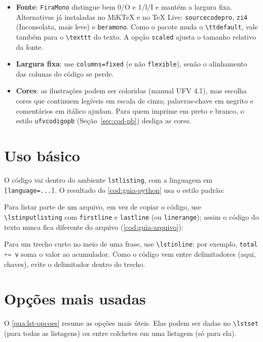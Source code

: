 \begin{itemize}
  \item \textbf{Fonte}: \texttt{FiraMono} distingue bem 0/O e 1/l/I e mantém a largura fixa.
        Alternativas já instaladas no MiKTeX e no TeX Live: \texttt{sourcecodepro},
        \texttt{zi4} (Inconsolata, mais leve) e \texttt{beramono}. Como o pacote muda o
        \texttt{\textbackslash ttdefault}, vale também para o \texttt{\textbackslash texttt} do texto.
        A opção \texttt{scaled} ajusta o tamanho relativo da fonte.
  \item \textbf{Largura fixa}: use \texttt{columns=fixed} (e não \texttt{flexible}), senão o
        alinhamento das colunas do código se perde.
  \item \textbf{Cores}: as ilustrações podem ser coloridas (manual UFV 4.1), mas escolha
        cores que continuem legíveis em escala de cinza; palavras-chave em negrito e
        comentários em itálico ajudam. Para quem imprime em preto e branco, o estilo
        \texttt{ufvcodigopb} (Seção~\ref{sec:cod-pb}) desliga as cores.
\end{itemize}

\section{Uso básico}

O código vai dentro do ambiente \texttt{lstlisting}, com a linguagem em
\texttt{[language=...]}. O resultado do \autoref{cod:guia-python} usa o estilo padrão:


Para listar parte de um arquivo, em vez de copiar o código, use \texttt{\textbackslash lstinputlisting}
com \texttt{firstline} e \texttt{lastline} (ou \texttt{linerange}); assim o código do texto
nunca fica diferente do arquivo (\autoref{cod:guia-arquivo}):


Para um trecho curto no meio de uma frase, use \texttt{\textbackslash lstinline}: por
exemplo, \lstinline[language=Python]{total += v} soma o valor ao acumulador. Como o código
vem entre delimitadores (aqui, chaves), evite o delimitador dentro do trecho.

\section{Opções mais usadas}

O \autoref{qua:lst-opcoes} resume as opções mais úteis. Elas podem ser dadas no
\texttt{\textbackslash lstset} (para todas as listagens) ou entre colchetes em uma listagem
(só para ela).

